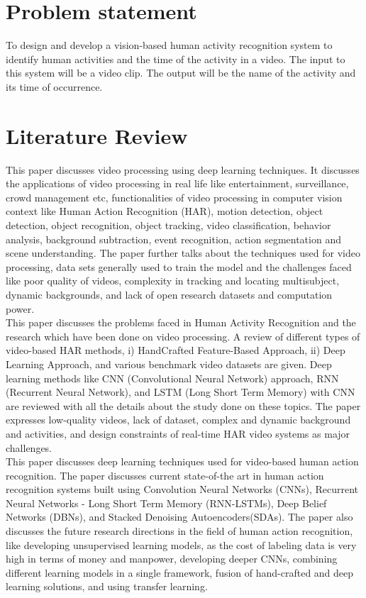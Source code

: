 \documentclass[twocolumn]{article}
\begin{document}
\section{Problem statement}
To design and develop a vision-based human activity recognition system to identify human activities and the time of the activity in a video. The input to this system
will be a video clip. The output will be the name of the activity and its time of occurrence.

\section{Literature Review}
\cite{b1} This paper discusses video processing using deep learning techniques. It discusses the applications of video processing in real life like entertainment, surveillance, crowd
management etc, functionalities of video processing in computer vision context like Human Action Recognition (HAR), motion detection, object detection, object recognition, object tracking,
video classification, behavior analysis, background subtraction, event recognition, action segmentation and scene understanding. The paper further talks about the techniques used for video processing,
data sets generally used to train the model and the challenges faced like poor quality of videos, complexity in tracking and locating multisubject, dynamic backgrounds, and lack of open research
datasets and computation power.\\
\cite{b2} This paper discusses the problems faced in Human Activity Recognition and the research which have been done on video processing.
A review of different types of video-based HAR methods, i) HandCrafted Feature-Based Approach, ii) Deep Learning Approach, and various benchmark video datasets are given.
Deep learning methods like CNN (Convolutional Neural Network) approach, RNN (Recurrent Neural Network), and LSTM (Long Short Term Memory) with CNN are reviewed with all the details
about the study done on these topics. The paper expresses low-quality videos, lack of dataset, complex and dynamic background and activities, and design constraints of real-time HAR video systems
as major challenges.\\
\cite{b3} This paper discusses deep learning techniques used for video-based human action recognition. The paper discusses current state-of-the art in human action recognition
systems built using Convolution Neural Networks (CNNs), Recurrent Neural Networks - Long Short Term Memory (RNN-LSTMs), Deep Belief Networks (DBNs), and Stacked Denoising Autoencoders(SDAs).
The paper also discusses the future research directions in the field of human action recognition, like developing unsupervised learning models, as the cost of labeling data is very high
in terms of money and manpower, developing deeper CNNs, combining different learning models in a single framework, fusion of hand-crafted and deep learning solutions, and using transfer learning.
\end{document}
